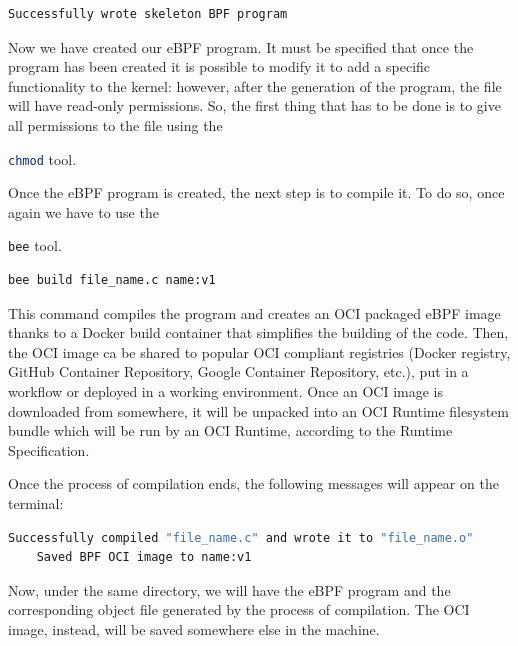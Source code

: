 \begin{lstlisting}[style=commandline, language=bash, caption={Successful program creation message using \colorbox{backcolour}{\lstinline[style=commandline, language=bash]|bee|}.}]
	Successfully wrote skeleton BPF program
\end{lstlisting}

Now we have created our eBPF program.
It must be specified that once the program has been created it is possible to modify it to add a specific functionality to the kernel: however, after the generation of the program, the file will have read-only permissions.
So, the first thing that has to be done is to give all permissions to the file using the \raggedright\colorbox{backcolour}{\lstinline[style=commandline, language=bash]|chmod|} tool.

Once the eBPF program is created, the next step is to compile it.
To do so, once again we have to use the \raggedright\colorbox{backcolour}{\lstinline[style=commandline, language=bash]|bee|} tool.

\begin{lstlisting}[style=commandline, language=bash, caption={\colorbox{backcolour}{\lstinline[style=commandline, language=bash]|bee|} build command.}]
	bee build file_name.c name:v1
\end{lstlisting}

This command compiles the program and creates an OCI packaged eBPF image thanks to a Docker build container that simplifies the building of the code.
Then, the OCI image ca be shared to popular OCI compliant registries (Docker registry, GitHub Container Repository, Google Container Repository, etc.), put in a workflow or deployed in a working environment.
Once an OCI image is downloaded from somewhere, it will be unpacked into an OCI Runtime filesystem bundle which will be run by an OCI Runtime, according to the Runtime Specification.

Once the process of compilation ends, the following messages will appear on the terminal: 

\begin{lstlisting}[style=commandline, language=bash, caption={Successful OCI image creation messages using \colorbox{backcolour}{\lstinline[style=commandline, language=bash]|bee|}.}]
	Successfully compiled "file_name.c" and wrote it to "file_name.o"
	Saved BPF OCI image to name:v1
\end{lstlisting}

Now, under the same directory, we will have the eBPF program and the corresponding object file generated by the process of compilation.
The OCI image, instead, will be saved somewhere else in the machine.

